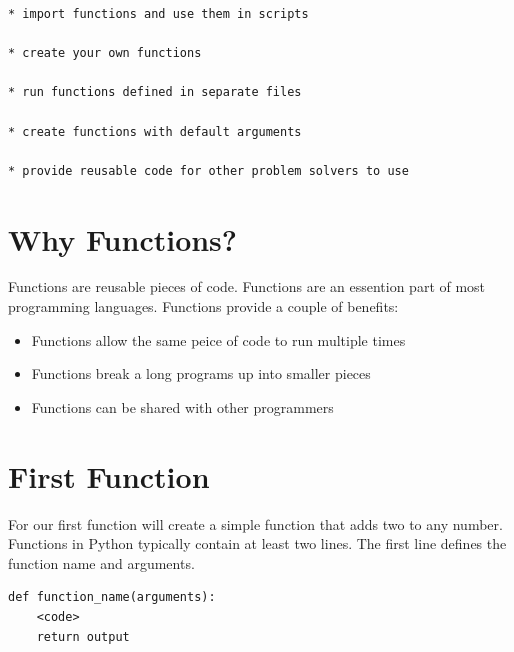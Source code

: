 \documentclass{book}
\begin{document}
\begin{lstlisting}
* import functions and use them in scripts

* create your own functions 

* run functions defined in separate files

* create functions with default arguments

* provide reusable code for other problem solvers to use
\end{lstlisting}
        \newpage



    




    
        \section{Why Functions?}\label{why-functions}
    




    
        Functions are reusable pieces of code. Functions are an essention part
of most programming languages. Functions provide a couple of benefits:

\begin{itemize}
\item
  Functions allow the same peice of code to run multiple times
\item
  Functions break a long programs up into smaller pieces
\item
  Functions can be shared with other programmers
\end{itemize}
    




    
        \section{First Function}\label{first-function}
    




    
        For our first function will create a simple function that adds two to
any number. Functions in Python typically contain at least two lines.
The first line defines the function name and arguments.

\begin{lstlisting}
def function_name(arguments):
    <code>
    return output
\end{lstlisting}
\end{document}
